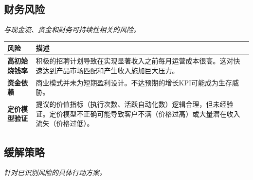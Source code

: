 \documentclass[11点, A4纸, 单面]{article}
\begin{document}
\newpage
\subsection{财务风险}
\textit{与现金流、资金和财务可持续性相关的风险。}

\begin{table}[H]
\centering
\begin{tabularx}{\textwidth}{@{}lL@{}}
\toprule
\textbf{风险} & \textbf{描述} \\
\midrule
\textbf{高初始烧钱率} & 积极的招聘计划导致在实现显著收入之前每月运营成本很高。这对快速达到产品市场匹配和产生收入施加巨大压力。 \\
\addlinespace
\textbf{资金依赖} & 商业模式并未为短期盈利设计。不达预期的增长KPI可能成为生存威胁。 \\
\addlinespace
\textbf{定价模型验证} & 提议的价值指标（执行次数、活跃自动化数）逻辑合理，但未经验证。定价模型不正确可能导致客户不满（价格过高）或大量潜在收入流失（价格过低）。 \\
\bottomrule
\end{tabularx}
\end{table}

\newpage
\subsection{缓解策略}
\textit{针对已识别风险的具体行动方案。}
\end{document}
